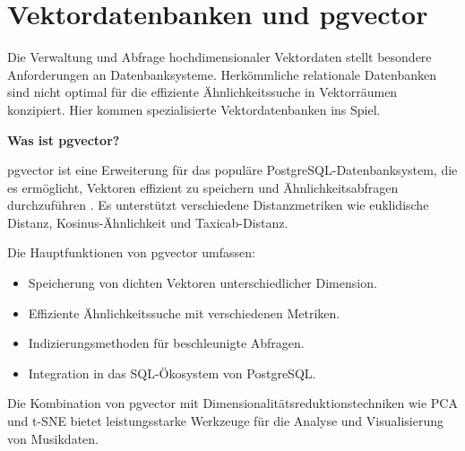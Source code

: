 \section{Vektordatenbanken und pgvector}

Die Verwaltung und Abfrage hochdimensionaler Vektordaten stellt besondere Anforderungen an Datenbanksysteme. Herkömmliche relationale Datenbanken sind nicht optimal für die effiziente Ähnlichkeitssuche in Vektorräumen konzipiert. Hier kommen spezialisierte Vektordatenbanken ins Spiel.

\textbf{Was ist pgvector?}

pgvector ist eine Erweiterung für das populäre PostgreSQL-Datenbanksystem, die es ermöglicht, Vektoren effizient zu speichern und Ähnlichkeitsabfragen durchzuführen \cite{pgvector}. Es unterstützt verschiedene Distanzmetriken wie euklidische Distanz, Kosinus-Ähnlichkeit und Taxicab-Distanz.

Die Hauptfunktionen von pgvector umfassen:

\begin{itemize}
    \item Speicherung von dichten Vektoren unterschiedlicher Dimension.
    \item Effiziente Ähnlichkeitssuche mit verschiedenen Metriken.
    \item Indizierungsmethoden für beschleunigte Abfragen.
    \item Integration in das SQL-Ökosystem von PostgreSQL.
\end{itemize}

Die Kombination von pgvector mit Dimensionalitätsreduktionstechniken wie \ac{PCA} und \ac{t-SNE} bietet leistungsstarke Werkzeuge für die Analyse und Visualisierung von Musikdaten.